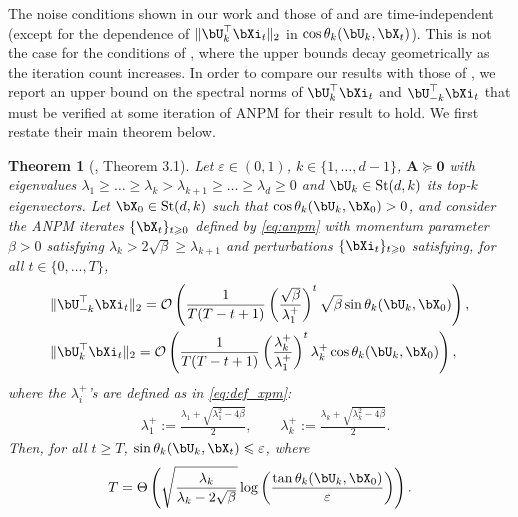 \documentclass{article}
\theoremstyle{plain}
\newtheorem{theorem}{Theorem}[section]
\theoremstyle{definition}
\theoremstyle{remark}
\begin{document}
The noise conditions shown in our work and those of \citet{hardt14} and \citet{balcan2016} are time-independent (except for the dependence of $\Vert \bU_k^\top\bXi_t\Vert_2$ in $\cos\theta_k(\bU_k,\bX_t)$). This is not the case for the conditions of \citet{xu2023anpm}, where the upper bounds decay geometrically as the iteration count increases. In order to compare our results with those of \citet{xu2023anpm}, we report an upper bound on the spectral norms of $\bU_k^\top\bXi_t$ and $\bU_{-k}^\top\bXi_t$ that must be verified at some iteration of ANPM for their result to hold. We first restate their main theorem below.
\begin{theorem}[\citet{xu2023anpm}, Theorem 3.1]\label{th:xuanpm}
    Let $\varepsilon \in (0,1)$, $k \in \{1,\dots,d-1\}$, $\mathbf{A} \succeq \mathbf{0}$ with eigenvalues $\lambda_1 \geqslant \dots \geqslant \lambda_k > \lambda_{k+1} \geqslant \dots \geqslant \lambda_d \geqslant 0$ and $\bU_k \in \mathrm{St}(d,k)$ its top-$k$ eigenvectors. Let $\bX_0 \in \mathrm{St}(d,k)$ such that $\cos\theta_k(\bU_k, \bX_0) > 0$, and consider the ANPM iterates $\{\bX_t\}_{t\geqslant 0}$ defined by \eqref{eq:anpm} with momentum parameter $\beta > 0$ satisfying $\lambda_k > 2\sqrt{\beta} \geqslant \lambda_{k+1}$ and perturbations $\{\bXi_t\}_{t\geqslant 0}$ satisfying, for all $t\in \{0,\dots,T\}$,   
    \begin{align}
        & \Vert \bU_{-k}^\top\bXi_t \Vert_2 = \mathcal{O} \left(\frac{1}{T(T-t+1)} \left(\frac{\sqrt{\beta}}{\lambda_1^+}\right)^t \sqrt{\beta} \sin\theta_k(\bU_k, \bX_0)\right) , \label{eq:xunoisecond1} \\
        & \Vert \bU_k^\top \bXi_t \Vert_2 = \mathcal{O} \left( \frac{1}{T(T-t+1)} \left(\frac{\lambda_k^+}{\lambda_1^+}\right)^t \lambda_k^+ \cos\theta_k(\bU_k, \bX_0)\right), \label{eq:xunoisecond2}
    \end{align}
    where the $\lambda_i^+$'s are defined as in \eqref{eq:def_xpm}:
    \begin{align*}
        & \lambda_1^+ := \frac{\lambda_1 + \sqrt{\lambda_1^2 - 4\beta}}{2}, \qquad \lambda_k^+ := \frac{\lambda_k + \sqrt{\lambda_k^2 - 4\beta}}{2}.
    \end{align*}
    Then, for all $t \geqslant T$, $\sin\theta_k(\bU_k, \bX_t) \leqslant \varepsilon$, where
    \begin{align*}
        T = \Theta\left(\sqrt{\frac{\lambda_k}{\lambda_k - 2\sqrt{\beta}}} \log\left(\frac{\tan\theta_k(\bU_k, \bX_0)}{\varepsilon}\right)\right).
    \end{align*} 
\end{theorem}
\end{document}
